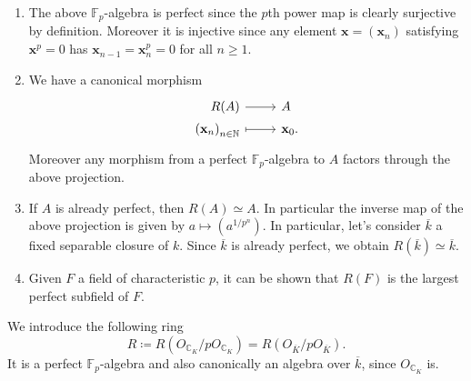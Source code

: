 \newpage
\begin{rem}[]\leavevmode\vspace{-.2\baselineskip}
\begin{enumerate}
\item The above $\mathbb{F}_p$-algebra is perfect
	since the $p$th power map is clearly surjective by definition.
	Moreover it is injective since any element $\mathbf{x} = \left( \mathbf{x}_n \right)$
	satisfying $\mathbf{x}^p = 0$ has
	$\mathbf{x}_{n-1} = \mathbf{x}_n^p = 0$ for all $n \geq 1$.

\item We have a canonical morphism
	\begin{equation*}
	\begin{tikzcd}[row sep = 0ex
		,/tikz/column 1/.append style={anchor=base east}
		,/tikz/column 2/.append style={anchor=base west}]
		R(A) \arrow[r, "", rightarrow] &
		A \\
		\left( \mathbf{x}_n \right)_{n \in \mathbb{N}} \arrow[r, "", mapsto] & 
		\mathbf{x}_0
	.\end{tikzcd}
	\end{equation*} 
	Moreover any morphism from a perfect $\mathbb{F}_p$-algebra
	to $A$ factors through the above projection.

\item If $A$ is already perfect, then $R(A) \simeq A$.
	In particular the inverse map of the above projection is given by
	$a \mapsto \left( a^{1/p^n} \right)$.
	In particular, let's consider $\overline{k}$ a fixed separable closure of $k$.
	Since $\overline{k}$ is already perfect, we obtain $R(\overline{k}) \simeq \overline{k}$.

\item Given $F$ a field of characteristic $p$, it can be shown that 
	$R(F)$ is the largest perfect subfield of $F$.
\end{enumerate}
\end{rem}


\begin{ntt}[]
	We introduce the following ring
	\begin{equation*}
		R \coloneqq R(O_{\mathbb{C}_K}/pO_{\mathbb{C}_K}) =
		R(O_{\overline{K}}/pO_{\overline{K}})
	.\end{equation*}
	It is a perfect $\mathbb{F}_p$-algebra and also canonically an
	algebra over $\overline{k}$, since $O_{\mathbb{C}_K}$ is.
\end{ntt}


